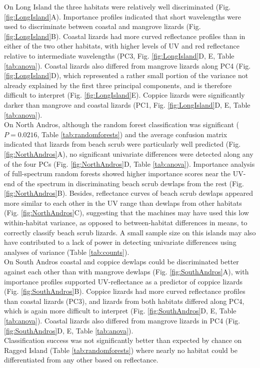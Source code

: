 On Long Island the three habitats were relatively well discriminated (Fig. \ref{fig:LongIsland}A). Importance profiles indicated that short wavelengths were used to discriminate between coastal and mangrove lizards (Fig. \ref{fig:LongIsland}B). Coastal lizards had more curved reflectance profiles than in either of the two other habitats, with higher levels of UV and red reflectance relative to intermediate wavelengths (PC3, Fig. \ref{fig:LongIsland}D, E, Table \ref{tab:anova}). Coastal lizards also differed from mangrove lizards along PC4 (Fig. \ref{fig:LongIsland}D), which represented a rather small portion of the variance not already explained by the first three principal components, and is therefore difficult to interpret (Fig. \ref{fig:LongIsland}E). Coppice lizards were significantly darker than mangrove and coastal lizards (PC1, Fig. \ref{fig:LongIsland}D, E, Table \ref{tab:anova}).\\ 

On North Andros, although the random forest classification was significant ($P = 0.0216$, Table \ref{tab:randomforests}) and the average confusion matrix indicated that lizards from beach scrub were particularly well predicted (Fig. \ref{fig:NorthAndros}A), no significant univariate differences were detected along any of the four PCs (Fig. \ref{fig:NorthAndros}D, Table \ref{tab:anova}). Importance analysis of full-spectrum random forests showed higher importance scores near the UV-end of the spectrum in discriminating beach scrub dewlaps from the rest (Fig. \ref{fig:NorthAndros}B). Besides, reflectance curves of beach scrub dewlaps appeared more similar to each other in the UV range than dewlaps from other habitats (Fig. \ref{fig:NorthAndros}C), suggesting that the machines may have used this low within-habitat variance, as opposed to between-habitat differences in means, to correctly classify beach scrub lizards. A small sample size on this islands may also have contributed to a lack of power in detecting univariate differences using analyses of variance (Table \ref{tab:counts}).\\

On South Andros coastal and coppice dewlaps could be discriminated better against each other than with mangrove dewlaps (Fig. \ref{fig:SouthAndros}A), with importance profiles supported UV-reflectance as a predictor of coppice lizards (Fig. \ref{fig:SouthAndros}B). Coppice lizards had more curved reflectance profiles than coastal lizards (PC3), and lizards from both habitats differed along PC4, which is again more difficult to interpret (Fig. \ref{fig:SouthAndros}D, E, Table \ref{tab:anova}). Coastal lizards also differed from mangrove lizards in PC4 (Fig. \ref{fig:SouthAndros}D, E, Table \ref{tab:anova}).\\

Classification success was not significantly better than expected by chance on Ragged Island (Table \ref{tab:randomforests}) where nearly no habitat could be differentiated from any other based on reflectance.